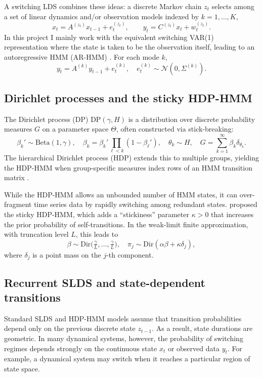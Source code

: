 \documentclass[11pt]{article}
\begin{document}
A switching LDS combines these ideas: a discrete Markov chain $z_t$
selects among a set of linear dynamics and/or observation models
indexed by $k = 1,\dots,K$,
\[
  x_t = A^{(z_t)} x_{t-1} + e_t^{(z_t)},
  \qquad
  y_t = C^{(z_t)} x_t + w_t^{(z_t)}.
\]
In this project I mainly work with the equivalent switching VAR(1)
representation where the state is taken to be the observation itself,
leading to an autoregressive HMM (AR-HMM)
\citep{fox2008}. For each mode $k$,
\[
  y_t = A^{(k)} y_{t-1} + e_t^{(k)}, \quad e_t^{(k)} \sim
  \mathcal{N}(0, \Sigma^{(k)}).
\]

\subsection{Dirichlet processes and the sticky HDP-HMM}

The Dirichlet process (DP) $\mathrm{DP}(\gamma, H)$ is a distribution
over discrete probability measures $G$ on a parameter space $\Theta$,
often constructed via stick-breaking:
\[
  \beta_k' \sim \mathrm{Beta}(1,\gamma),\quad
  \beta_k = \beta_k' \prod_{\ell<k} (1 - \beta_\ell'),\quad
  \theta_k \sim H, \quad
  G = \sum_{k=1}^\infty \beta_k \delta_{\theta_k}.
\]
The hierarchical Dirichlet process (HDP) extends this to multiple
groups, yielding the HDP-HMM when group-specific measures index
rows of an HMM transition matrix \citep{teh2006, beal2002}.

While the HDP-HMM allows an unbounded number of HMM states, it can
over-fragment time series data by rapidly switching among redundant
states. \citet{fox2008} proposed the sticky HDP-HMM, which adds a
``stickiness'' parameter $\kappa > 0$ that increases the prior
probability of self-transitions. In the weak-limit finite
approximation, with truncation level $L$, this leads to
\[
  \beta \sim \mathrm{Dir}\Big(\tfrac{\gamma}{L},\dots,\tfrac{\gamma}{L}\Big),
  \quad
  \pi_j \sim \mathrm{Dir}(\alpha \beta + \kappa \delta_j),
\]
where $\delta_j$ is a point mass on the $j$-th component.

\subsection{Recurrent SLDS and state-dependent transitions}

Standard SLDS and HDP-HMM models assume that transition probabilities
depend only on the previous discrete state $z_{t-1}$. As a result,
state durations are geometric. In many dynamical systems, however, the
probability of switching regimes depends strongly on the continuous
state $x_t$ or observed data $y_t$. For example, a dynamical system may
switch when it reaches a particular region of state space.
\end{document}
